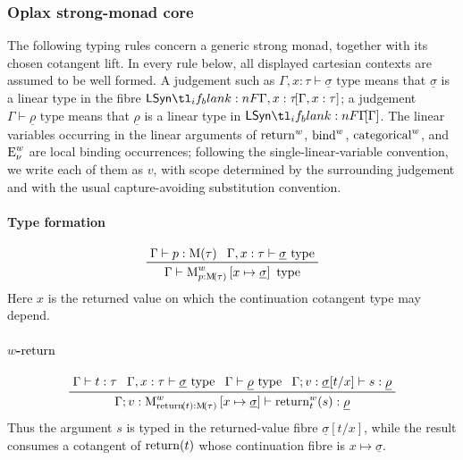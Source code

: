 \documentclass[11pt,a4paper]{article}
\theoremstyle{definition}
\theoremstyle{remark}
\providecommand{\casubst}[3]{#1[#3/#2]}
\providecommand{\lintype}[1]{\underline{#1}}
\begin{document}
\subsubsection{Oplax strong-monad core}

The following typing rules concern a generic strong monad, together with its
chosen cotangent lift.  In every rule below, all displayed cartesian contexts are
assumed to be well formed.  A judgement such as
\( \Gamma, x : \tau \vdash \lintype{\sigma} \text{ type} \) means that
\( \lintype{\sigma} \) is a linear type in the fibre
\( \LSyn[\Gamma,x:\tau] \); a judgement
\( \Gamma \vdash \lintype{\rho} \text{ type} \) means that
\( \lintype{\rho} \) is a linear type in \( \LSyn[\Gamma] \).  The linear
variables occurring in the linear arguments of
\( \opn[b]{return}^{w} \), \( \opn[b]{bind}^{w} \),
\( \opn[b]{categorical}^{w} \), and \( \opn[b]{E}_{\nu}^{w} \) are local binding
occurrences; following the single-linear-variable convention, we write each of
them as \(v\), with scope determined by the surrounding judgement and with the
usual capture-avoiding substitution convention.

\paragraph{Type formation}

\begin{equation*}
  \prftree{
    \Gamma \vdash p : \Fun[nn]{ \opn[b]{M} }{ \tau }
  }{
    \Gamma,x:\tau \vdash \lintype{\sigma} \text{ type}
  }{
    \Gamma \vdash
    \opn[b]{M}^{w}_{p : \Fun[nn]{ \opn[b]{M} }{ \tau }}
    \left[ x \mapsto \lintype{\sigma} \right]
    \text{ type}
  }
\end{equation*}
Here \(x\) is the returned value on which the continuation cotangent type
may depend.

\paragraph{\( w \)-\( \opn[b]{return} \)}

\begin{equation*}
  \prftree{
    \Gamma \vdash t: \tau
  }{
    \Gamma, x : \tau \vdash \lintype{\sigma} \text{ type}
  }{
    \Gamma \vdash \lintype{\rho} \text{ type}
  }{
    \Gamma; v : \casubst{ \lintype{\sigma} }{x}{t}
    \vdash  s : \lintype{\rho}
  }{
    \Gamma; v : \opn[b]{M}^{w}_{\fn[n]{ \opn[b]{return} }{ t } : \Fun[nn]{ \opn[b]{M} }{ \tau }}
    \left[ x\mapsto \lintype{\sigma} \right]
    \vdash
    \fn[n]{ \opn[b]{return}^{w}_{t} }{ s }: \lintype{\rho}
  }
\end{equation*}
Thus the argument \(s\) is typed in the returned-value fibre
\(\casubst{\lintype{\sigma}}{x}{t}\), while the result consumes a cotangent of
\(\fn[n]{\opn[b]{return}}{t}\) whose continuation fibre is
\(x\mapsto\lintype{\sigma}\).
\end{document}
